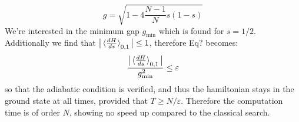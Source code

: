     \begin{equation}
      g=\sqrt{1-4\frac{N-1}{N}s(1-s)}
      \label{separation}
    \end{equation}
    We're interested in the minimum gap $g_{\min}$ which is found for $s=1/2$. Additionally we find that $\big|\braket{\frac{dH}{ds}}_{0,1}\big| \leq 1$, therefore Eq? becomes:
    \begin{equation}
      \frac{\big|\braket{\frac{dH}{ds}}_{0,1}\big|}{g_{\min}^2} \leq \varepsilon
      \label{adiabatic_condition}
    \end{equation}
    so that the adiabatic condition is verified, and thus the hamiltonian stays in the ground state at all times, provided that $T\geq N/\varepsilon$. Therefore the computation time is of order $N$, showing no speed up compared to the classical search.

